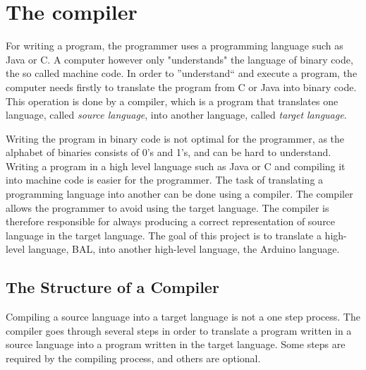 \chapter{The compiler} \label{chap:the_compiler}
For writing a program, the programmer uses a programming language such as Java or C. A computer however only "understands" the language of binary code, the so called machine code. In order to ''understand`` and execute a program, the computer needs firstly to translate the program from C or Java into binary code. This operation is done by a compiler, which is a program that translates one language, called \textit{source language}, into another language, called \textit{target language}. 

Writing the program in binary code is not optimal for the programmer, as the alphabet of binaries consists of 0's and 1's, and can be hard to understand. Writing a program in a high level language such as Java or C and compiling it into machine code is easier for the programmer. The task of translating a programming language into another can be done using a compiler. The compiler allows the programmer to avoid using the target language. The compiler is therefore responsible for always producing a correct representation of source language in the target language. The goal of this project is to translate a high-level language, BAL, into another high-level language, the Arduino language.

\section{The Structure of a Compiler} 
\label{sec:compiler}
Compiling a source language into a target language is not a one step process. The compiler goes through several steps in order to translate a program written in a source language into a program written in the target language. Some steps are required by the compiling process, and others are optional.

